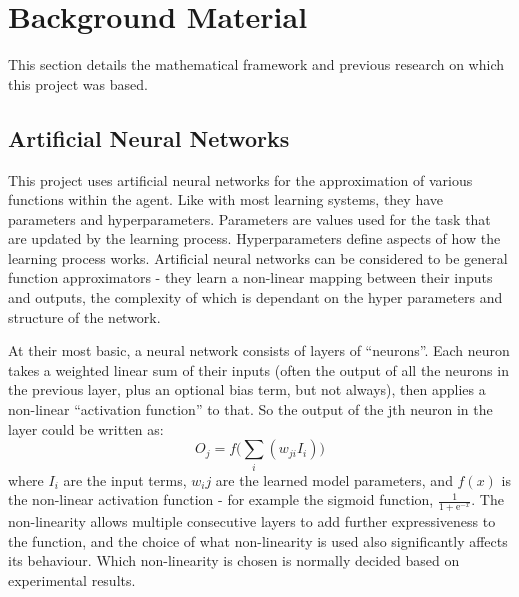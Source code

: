 



\section{Background Material}
This section details the mathematical framework and previous research on which this project was based.

\subsection{Artificial Neural Networks}
This project uses artificial neural networks for the approximation of various functions within the agent. Like with most learning systems, they have parameters and hyperparameters. Parameters are values used for the task that are updated by the learning process. Hyperparameters define aspects of how the learning process works.
  Artificial neural networks can be considered to be general function approximators - they learn a non-linear mapping between their inputs and outputs, the complexity of which is dependant on the hyper parameters and structure of the network.

At their most basic, a neural network consists of layers of ``neurons''. Each neuron takes a weighted linear sum of their inputs (often the output of all the neurons in the previous layer, plus an optional bias term, but not always), then applies a non-linear ``activation function'' to that.  So the output of the jth neuron in the layer could be written as:
\begin{equation}
O_j = f\big( \sum_i (w_{ji}I_i)\big)
\end{equation} where $I_i$ are the input terms, $w_ij$ are the learned model parameters, and $f(x)$ is the non-linear activation function - for example the sigmoid function, $\frac{1}{1+ \text{e}^{-x}}$.   The non-linearity allows multiple consecutive layers to add further expressiveness to the function, and the choice of what non-linearity is used also significantly affects its behaviour. Which non-linearity is chosen is normally decided based on experimental results.

